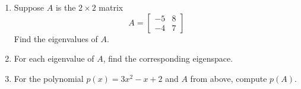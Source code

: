 
%
\begin{enumerate}
%
\item Suppose $A$ is the $2\times 2$ matrix
%
\begin{equation*}
A=\begin{bmatrix}
-5 & 8\\-4 & 7
\end{bmatrix}
\end{equation*}
%
Find the eigenvalues of $A$.
%
\item For each eigenvalue of $A$, find the corresponding eigenspace.
%
\item For the polynomial $p(x)=3x^2-x+2$ and $A$ from above, compute $p(A)$.
%
\end{enumerate}